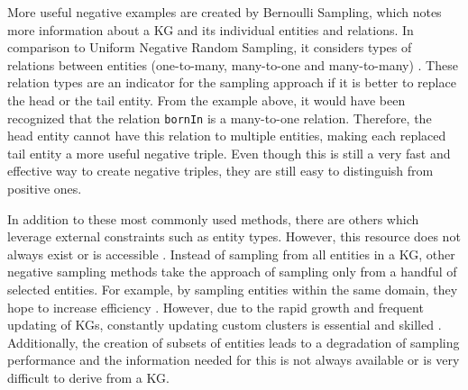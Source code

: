 More useful negative examples are created by Bernoulli Sampling, which notes more information about a \ac{KG} and its individual entities and relations.
In comparison to Uniform Negative Random Sampling, it considers types of relations between entities (one-to-many, many-to-one and many-to-many) \cite{zhang2021efficient}.
These relation types are an indicator for the sampling approach if it is better to replace the head or the tail entity.
From the example above, it would have been recognized that the relation \texttt{bornIn} is a many-to-one relation.
Therefore, the head entity cannot have this relation to multiple entities, making each replaced tail entity a more useful negative triple.
Even though this is still a very fast and effective way to create negative triples, they are still easy to distinguish from positive ones.

In addition to these most commonly used methods, there are others which leverage external constraints such as entity types.
However, this resource does not always exist or is accessible \cite{cai2017kbgan}.
Instead of sampling from all entities in a \ac{KG}, other negative sampling methods take the approach of sampling only from a handful of selected entities.
For example, by sampling entities within the same domain, they hope to increase efficiency \cite{qiannegative}.
However, due to the rapid growth and frequent updating of \acp{KG}, constantly updating custom clusters is essential and skilled \cite{qiannegative}. 
Additionally, the creation of subsets of entities leads to a degradation of sampling performance and the information needed for this is not always available or is very difficult to derive from a \ac{KG}.



 
